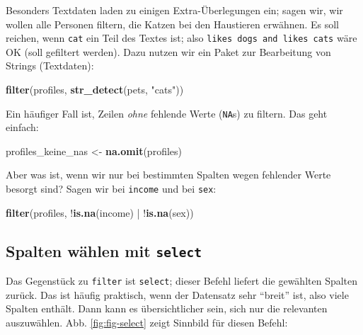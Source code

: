 \documentclass[12pt,ngerman,]{book}
\makeatletter
\newenvironment{Shaded}{\begin{snugshade}}{\end{snugshade}}
\newcommand{\KeywordTok}[1]{\textcolor[rgb]{0.13,0.29,0.53}{\textbf{{#1}}}}
\newcommand{\StringTok}[1]{\textcolor[rgb]{0.31,0.60,0.02}{{#1}}}
\newcommand{\NormalTok}[1]{{#1}}
\newenvironment{kframe}{%
\medskip{}
\setlength{\fboxsep}{.8em}
 \def\at@end@of@kframe{}%
 \ifinner\ifhmode%
  \def\at@end@of@kframe{\end{minipage}}%
  \begin{minipage}{\columnwidth}%
 \fi\fi%
 \def\FrameCommand##1{\hskip\@totalleftmargin \hskip-\fboxsep
 \colorbox{shadecolor}{##1}\hskip-\fboxsep
     \hskip-\linewidth \hskip-\@totalleftmargin \hskip\columnwidth}%
 \MakeFramed {\advance\hsize-\width
   \@totalleftmargin\z@ \linewidth\hsize
   \@setminipage}}%
 {\par\unskip\endMakeFramed%
 \at@end@of@kframe}
\renewenvironment{Shaded}{\begin{kframe}}{\end{kframe}}
\makeatother
\begin{document}
Besonders Textdaten laden zu einigen Extra-Überlegungen ein; sagen wir,
wir wollen alle Personen filtern, die Katzen bei den Haustieren
erwähnen. Es soll reichen, wenn \texttt{cat} ein Teil des Textes ist;
also \texttt{likes\ dogs\ and\ likes\ cats} wäre OK (soll gefiltert
werden). Dazu nutzen wir ein Paket zur Bearbeitung von Strings
(Textdaten):

\begin{Shaded}
\begin{Highlighting}[]

\KeywordTok{filter}\NormalTok{(profiles, }\KeywordTok{str_detect}\NormalTok{(pets, }\StringTok{"cats"}\NormalTok{))}
\end{Highlighting}
\end{Shaded}

Ein häufiger Fall ist, Zeilen \emph{ohne} fehlende Werte (\texttt{NA}s)
zu filtern. Das geht einfach:

\begin{Shaded}
\begin{Highlighting}[]
\NormalTok{profiles_keine_nas <-}\StringTok{ }\KeywordTok{na.omit}\NormalTok{(profiles)}
\end{Highlighting}
\end{Shaded}

Aber was ist, wenn wir nur bei bestimmten Spalten wegen fehlender Werte
besorgt sind? Sagen wir bei \texttt{income} und bei \texttt{sex}:

\begin{Shaded}
\begin{Highlighting}[]
\KeywordTok{filter}\NormalTok{(profiles, !}\KeywordTok{is.na}\NormalTok{(income) |}\StringTok{ }\NormalTok{!}\KeywordTok{is.na}\NormalTok{(sex))}
\end{Highlighting}
\end{Shaded}

\subsection{\texorpdfstring{Spalten wählen mit
\texttt{select}}{Spalten wählen mit select}}\label{spalten-wahlen-mit-select}

Das Gegenstück zu \texttt{filter} ist
\texttt{select}; dieser Befehl liefert die
gewählten Spalten zurück. Das ist häufig praktisch, wenn der Datensatz
sehr ``breit'' ist, also viele Spalten enthält. Dann kann es
übersichtlicher sein, sich nur die relevanten auszuwählen. Abb.
\ref{fig:fig-select} zeigt Sinnbild für diesen Befehl:
\end{document}
